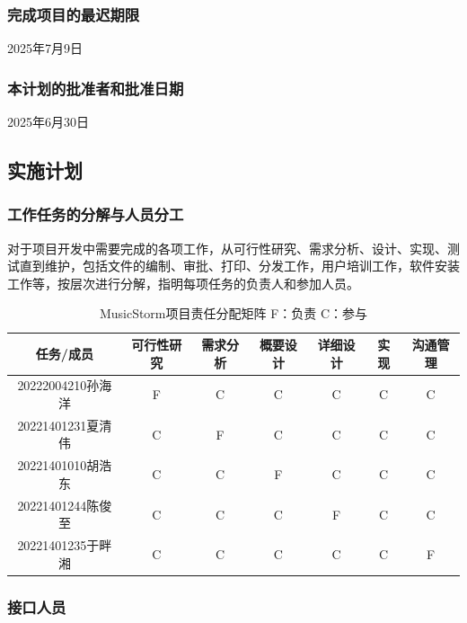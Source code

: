 \documentclass{base}
\numberwithin{figure}{section} %
\begin{document}
\subsubsection{完成项目的最迟期限}

2025年7月9日

\subsubsection{本计划的批准者和批准日期}

2025年6月30日

\subsection{实施计划}

\subsubsection{工作任务的分解与人员分工}

对于项目开发中需要完成的各项工作，从可行性研究、需求分析、设计、实现、测试直到维护，包括文件的编制、审批、打印、分发工作，用户培训工作，软件安装工作等，按层次进行分解，指明每项任务的负责人和参加人员。

\begin{longtable}{@{}ccccccc@{}}
\caption{MusicStorm项目责任分配矩阵  F：负责  C：参与}
\label{tab:my-table}\\
\toprule
任务/成员           & 可行性研究 & 需求分析 & 概要设计 & 详细设计 & 实现 & 沟通管理 \\* \midrule
\endhead
%
\bottomrule
\endfoot
%
\endlastfoot
%
20222004210孙海洋 & F     & C    & C    & C    & C  & C    \\
20221401231夏清伟 & C     & F    & C    & C    & C  & C    \\
20221401010胡浩东 & C     & C    & F    & C    & C  & C    \\
20221401244陈俊至 & C     & C    & C    & F    & C  & C    \\
20221401235于畔湘 & C     & C    & C    & C    & C  & F    \\* \bottomrule
\end{longtable}

\subsubsection{接口人员}
\end{document}
